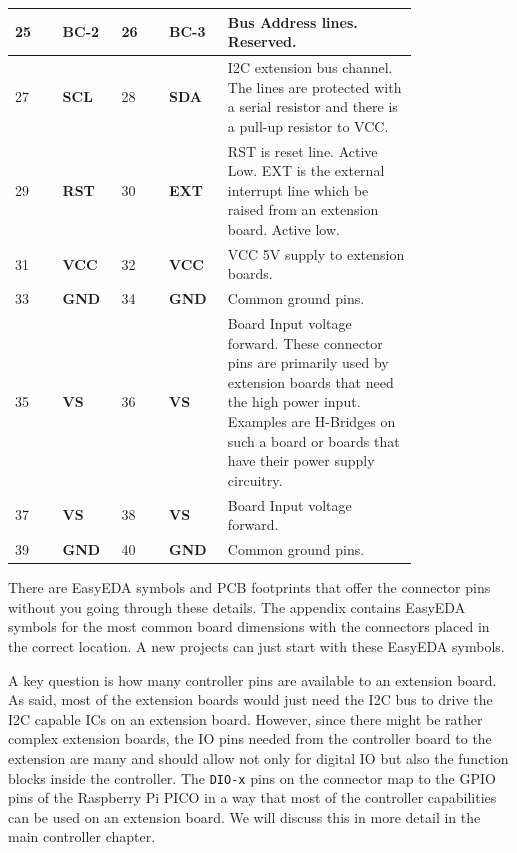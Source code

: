 \begin{longtable}{@{}|p{0.1\linewidth}|p{0.1\linewidth}|p{0.1\linewidth}|p{0.1\linewidth}|p{0.4\linewidth}|@{}}
    \midrule
    25 & \textbf{BC-2} & 26 & \textbf{BC-3} & Bus Address lines. Reserved. \\ 
    \midrule
    27 & \textbf{SCL} &  28 & \textbf{SDA} & I2C extension bus channel.  The lines are protected with a serial resistor and there is a pull-up resistor to VCC. \\
    \midrule
    29 & \textbf{RST} & 30 & \textbf{EXT} & RST is reset line. Active Low. EXT is the external interrupt line which be raised from an extension board. Active low. \\
    \midrule
    31 & \textbf{VCC} & 32 & \textbf{VCC} & VCC 5V supply to extension boards. \\
    \midrule
    33 & \textbf{GND} & 34 & \textbf{GND} & Common ground pins. \\
    \midrule
    35 & \textbf{VS} & 36 & \textbf{VS} & Board Input voltage forward. These  connector pins are primarily used by extension boards that need the high power input. Examples  are H-Bridges on such a board or boards that have their power supply circuitry. \\
    \midrule
    37 & \textbf{VS} & 38 & \textbf{VS} & Board Input voltage forward. \\
    \midrule
    39 & \textbf{GND} & 40 & \textbf{GND} & Common ground pins. \\
\end{longtable}  

There are EasyEDA symbols and PCB footprints that offer the connector pins without you going through these details. The appendix contains EasyEDA symbols for the most common board dimensions with the connectors placed in the correct location. A new projects can just start with these EasyEDA symbols.

A key question is how many controller pins are available to an extension board. As said, most of the extension boards would just need the I2C bus to drive the I2C capable ICs on an extension board. However, since there might be rather complex extension boards, the IO pins needed from the controller board to the extension are many and should allow not only for digital IO but also the function blocks inside the controller. The \texttt{DIO-x} pins on the connector map to the GPIO pins of the Raspberry Pi PICO in a way that most of the controller capabilities can be used on an extension board. We will discuss this in more detail in the main controller chapter.

